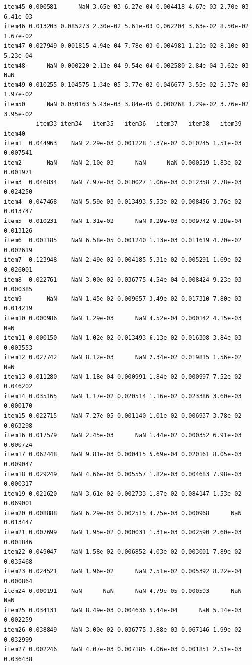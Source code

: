 \documentclass[
  a4paper,
]{ltjsbook}
\begin{document}
\begin{verbatim}
item45 0.000581      NaN 3.65e-03 6.27e-04 0.004418 4.67e-03 2.70e-03 6.41e-03
item46 0.013203 0.085273 2.30e-02 5.61e-03 0.062204 3.63e-02 8.50e-02 1.67e-02
item47 0.027949 0.001815 4.94e-04 7.78e-03 0.004981 1.21e-02 8.10e-03 5.23e-04
item48      NaN 0.000220 2.13e-04 9.54e-04 0.002580 2.84e-04 3.62e-03      NaN
item49 0.010255 0.104575 1.34e-05 3.77e-02 0.046677 3.55e-02 5.37e-03 1.97e-02
item50      NaN 0.050163 5.43e-03 3.84e-05 0.000268 1.29e-02 3.76e-02 3.95e-02
         item33 item34   item35   item36   item37   item38   item39   item40
item1  0.044963    NaN 2.29e-03 0.001228 1.37e-02 0.010245 1.51e-03 0.007541
item2       NaN    NaN 2.10e-03      NaN      NaN 0.000519 1.83e-02 0.001971
item3  0.046834    NaN 7.97e-03 0.010027 1.06e-03 0.012358 2.78e-03 0.024250
item4  0.047468    NaN 5.59e-03 0.013493 5.53e-02 0.008456 3.76e-02 0.013747
item5  0.010231    NaN 1.31e-02      NaN 9.29e-03 0.009742 9.28e-04 0.013126
item6  0.001185    NaN 6.58e-05 0.001240 1.13e-03 0.011619 4.70e-02 0.002619
item7  0.123948    NaN 2.49e-02 0.004185 5.31e-02 0.005291 1.69e-02 0.026001
item8  0.022761    NaN 3.00e-02 0.036775 4.54e-04 0.008424 9.23e-03 0.000385
item9       NaN    NaN 1.45e-02 0.009657 3.49e-02 0.017310 7.80e-03 0.014219
item10 0.000986    NaN 1.29e-03      NaN 4.52e-04 0.000142 4.15e-03      NaN
item11 0.000150    NaN 1.02e-02 0.013493 6.13e-02 0.016308 3.84e-03 0.003553
item12 0.027742    NaN 8.12e-03      NaN 2.34e-02 0.019815 1.56e-02      NaN
item13 0.011280    NaN 1.18e-04 0.000991 1.84e-02 0.000997 7.52e-02 0.046202
item14 0.035165    NaN 1.17e-02 0.020514 1.16e-02 0.023386 3.60e-03 0.000170
item15 0.022715    NaN 7.27e-05 0.001140 1.01e-02 0.006937 3.78e-02 0.063298
item16 0.017579    NaN 2.45e-03      NaN 1.44e-02 0.000352 6.91e-03 0.000724
item17 0.062448    NaN 9.81e-03 0.000415 5.69e-04 0.020161 8.05e-03 0.009047
item18 0.029249    NaN 4.66e-03 0.005557 1.82e-03 0.004683 7.98e-03 0.000317
item19 0.021620    NaN 3.61e-02 0.002733 1.87e-02 0.084147 1.53e-02 0.069001
item20 0.008888    NaN 6.29e-03 0.002515 4.75e-03 0.000968      NaN 0.013447
item21 0.007699    NaN 1.95e-02 0.000031 1.31e-03 0.002590 2.60e-03 0.001846
item22 0.049047    NaN 1.58e-02 0.006852 4.03e-02 0.003001 7.89e-02 0.035468
item23 0.024521    NaN 1.96e-02      NaN 2.51e-02 0.005392 8.22e-04 0.000864
item24 0.000191    NaN      NaN      NaN 4.79e-05 0.000593      NaN      NaN
item25 0.034131    NaN 8.49e-03 0.004636 5.44e-04      NaN 5.14e-03 0.002259
item26 0.038849    NaN 3.00e-02 0.036775 3.88e-03 0.067146 1.99e-02 0.032999
item27 0.002246    NaN 4.07e-03 0.007185 4.06e-03 0.001851 2.51e-03 0.036438

\end{verbatim}
\end{document}
